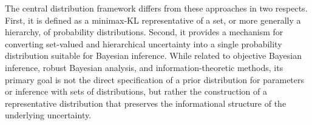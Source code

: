 The central distribution framework differs from these approaches in two respects.
First, it is defined as a minimax-KL representative of a set, or more generally a hierarchy, of probability
distributions.
Second, it provides a mechanism for converting set-valued and hierarchical uncertainty into a single probability
distribution suitable for Bayesian inference.
While related to objective Bayesian inference, robust Bayesian analysis, and information-theoretic methods, its
primary goal is not the direct specification of a prior distribution for parameters or inference with sets of
distributions, but rather the construction of a representative distribution that preserves the informational
structure of the underlying uncertainty.
